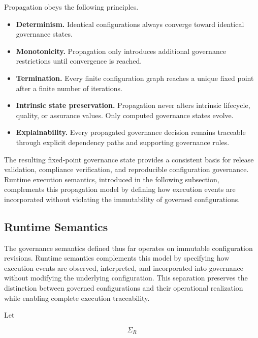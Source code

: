 \documentclass[10pt]{article}
\begin{document}
Propagation obeys the following principles.

\begin{itemize}

\item \textbf{Determinism.}
Identical configurations always converge toward identical governance states.

\item \textbf{Monotonicity.}
Propagation only introduces additional governance restrictions until convergence is reached.

\item \textbf{Termination.}
Every finite configuration graph reaches a unique fixed point after a finite number of iterations.

\item \textbf{Intrinsic state preservation.}
Propagation never alters intrinsic lifecycle, quality, or assurance values. Only computed governance states evolve.

\item \textbf{Explainability.}
Every propagated governance decision remains traceable through explicit dependency paths and supporting governance rules.

\end{itemize}

The resulting fixed-point governance state provides a consistent basis for release validation, compliance verification, and reproducible configuration governance. Runtime execution semantics, introduced in the following subsection, complements this propagation model by defining how execution events are incorporated without violating the immutability of governed configurations.

\subsection{Runtime Semantics}
\label{sec:runtime_semantics}

The governance semantics defined thus far operates on immutable configuration revisions. Runtime semantics complements this model by specifying how execution events are observed, interpreted, and incorporated into governance without modifying the underlying configuration. This separation preserves the distinction between governed configurations and their operational realization while enabling complete execution traceability.

Let

\[
\Sigma_R
\]
\end{document}
